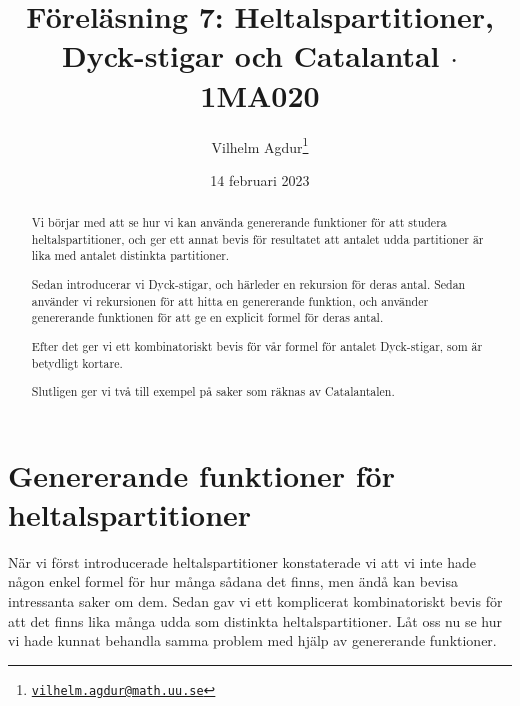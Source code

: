 \documentclass[nobib]{tufte-handout}
\title{Föreläsning 7: Heltalspartitioner, Dyck-stigar och Catalantal $\cdot$ 1MA020}
\author[Vilhelm Agdur]{Vilhelm Agdur\thanks{\href{mailto:vilhelm.agdur@math.uu.se}{\nolinkurl{vilhelm.agdur@math.uu.se}}}}
\date{14 februari 2023}
\begin{document}

\maketitle%

\begin{abstract}
\noindent
Vi börjar med att se hur vi kan använda genererande funktioner för att studera heltalspartitioner, och ger ett annat bevis för resultatet att antalet udda partitioner är lika med antalet distinkta partitioner.

Sedan introducerar vi Dyck-stigar, och härleder en rekursion för deras antal. Sedan använder vi rekursionen för att hitta en genererande funktion, och använder genererande funktionen för att ge en explicit formel för deras antal.

Efter det ger vi ett kombinatoriskt bevis för vår formel för antalet Dyck-stigar, som är betydligt kortare.

Slutligen ger vi två till exempel på saker som räknas av Catalantalen.
\end{abstract}

\section{Genererande funktioner för heltalspartitioner}

När vi först introducerade heltalspartitioner konstaterade vi att vi inte hade någon enkel formel för hur många sådana det finns, men ändå kan bevisa intressanta saker om dem. Sedan gav vi ett komplicerat kombinatoriskt bevis för att det finns lika många udda som distinkta heltalspartitioner. Låt oss nu se hur vi hade kunnat behandla samma problem med hjälp av genererande funktioner.
\end{document}
